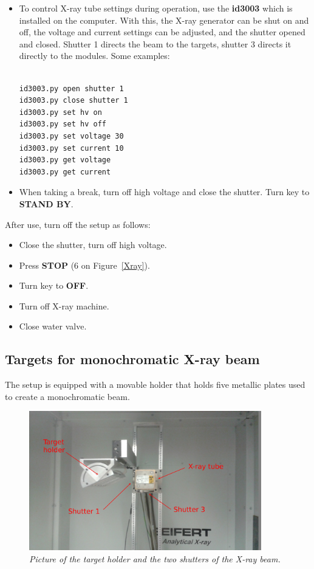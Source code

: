 \documentclass[a4paper,12pt,twoside]{article}
\begin{document}
\begin{itemize}
\item {To control X-ray tube settings during operation, use the \textbf{id3003} which is installed on the computer. With this, the X-ray generator can be shut on and off, the voltage and current settings can be adjusted, and the shutter opened and closed. Shutter 1 directs the beam to the targets, shutter 3 directs it directly to the modules. Some examples:
\\
\\
\begin{Verbatim}[frame=single]
id3003.py open shutter 1
id3003.py close shutter 1
id3003.py set hv on
id3003.py set hv off
id3003.py set voltage 30
id3003.py set current 10
id3003.py get voltage
id3003.py get current
\end{Verbatim}
}
\item{When taking a break, turn off high voltage and close the shutter. Turn key to \textbf{STAND BY}.}
\end{itemize}
After use, turn off the setup as follows:
\begin{itemize}
\item {Close the shutter, turn off high voltage.}
\item {Press \textbf{STOP} (6 on Figure~\ref{Xray}).}
\item {Turn key to \textbf{OFF}.}
\item {Turn off X-ray machine.}
\item {Close water valve.}
\end{itemize}
\subsection{Targets for monochromatic X-ray beam}

The setup is equipped with a movable holder that holds five metallic plates used to create a monochromatic beam. 

\begin{figure} [h!] \centering 
\includegraphics[width=0.9\textwidth, angle=0] {./Figures/Targets.jpg}
\caption{\em  \label{Targets}
Picture of the target holder and the two shutters of the X-ray beam.}
\end{figure}
\end{document}
